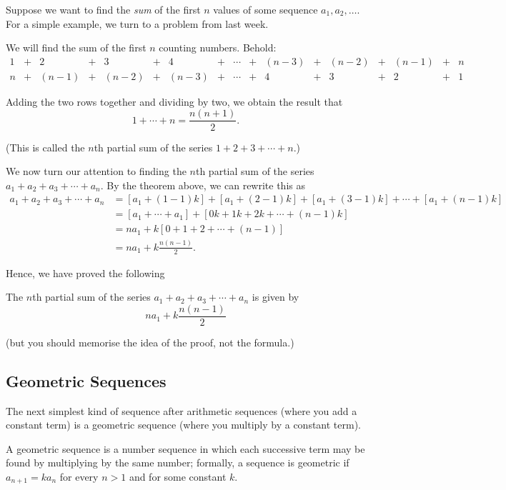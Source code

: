 Suppose we want to find the \emph{sum} of the first $ n $ values of some sequence $ a_1, a_2, \dots $. For a simple
example, we turn to a problem from last week.
\begin{ex}
  We will find the sum of the first $ n $ counting numbers. Behold:
  \begin{displaymath}
    \begin{array}{ccccccccccccccccc}
    1 &+& 2 &+& 3 &+& 4 &+& \cdots &+& (n - 3) &+& (n - 2) &+& (n - 1) &+& n\\
    n &+& (n - 1) &+& (n - 2) &+& (n - 3) &+& \cdots &+& 4 &+& 3 &+& 2 &+& 1
    \end{array}
  \end{displaymath}

  Adding the two rows together and dividing by two, we obtain the result that
  \begin{displaymath}
    1 + \cdots + n = \frac{n(n + 1)}{2}.
  \end{displaymath}

  (This is called the $ n$th partial sum of the series $ 1 + 2 + 3 + \cdots + n $.)
\end{ex}

We now turn our attention to finding the $ n$th partial sum of the series $ a_1 + a_2 + a_3 + \cdots + a_n $. By the
theorem above, we can rewrite this as
\begin{align*}
  a_1 + a_2 + a_3 + \cdots + a_n &= [a_1 + (1 - 1)k] + [a_1 + (2 - 1)k] + [a_1 + (3 - 1)k] + \cdots + [a_1 + (n - 1)k]\\
                                 &= [a_1 + \cdots + a_1] + [0k + 1k + 2k + \cdots + (n-1)k]\\
                                 &= na_1 + k[0 + 1 + 2 + \cdots + (n - 1)]\\
                                 &= na_1 + k \frac{n(n - 1)}{2}.
\end{align*}

Hence, we have proved the following
\begin{thm}
  The $ n$th partial sum of the series $ a_1 + a_2 + a_3 + \cdots + a_n $ is given by
  \begin{displaymath}
    na_1 + k \frac{n(n - 1)}{2}
  \end{displaymath}
\end{thm}
(but you should memorise the idea of the proof, not the formula.)

\subsection*{Geometric Sequences}
The next simplest kind of sequence after arithmetic sequences (where you add a constant term) is a geometric
sequence (where you multiply by a constant term).
\begin{defn}
  A geometric sequence is a number sequence in which each successive term may be found by multiplying by the
  same number; formally, a sequence is geometric if $ a_{n + 1} = ka_n $ for every $ n > 1 $ and for
  some constant $ k $.
\end{defn}

